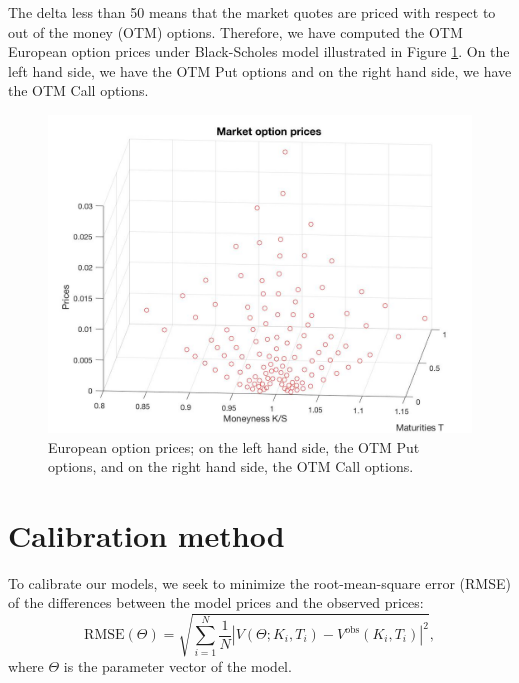 The delta less than 50 means that the market quotes are priced with respect to out of the money (OTM) options. Therefore, we have computed the OTM European option prices under Black-Scholes model illustrated in Figure \ref{fig:calibration:prices}. On the left hand side, we have the OTM Put options and on the right hand side, we have the OTM Call options.
\begin{figure}[!htb]
\centering
	\includegraphics[scale = 0.3]{gfx/Euro-prices}
	\caption{European option prices; on the left hand side, the OTM Put options, and on the right hand side, the OTM Call options.}
	\label{fig:calibration:prices}
\end{figure}

\section{Calibration method}
\label{sec:calibration:method}
To calibrate our models, we seek to minimize the root-mean-square error (RMSE) of the differences between the model prices and the observed prices:
$$\text{RMSE}(\Theta) = \sqrt{\sum_{i=1}^N \frac{1}{N}\left|V(\Theta;K_i,T_i)-V^\text{obs}(K_i,T_i)\right|^2},$$
where $\Theta$ is the parameter vector of the model.


